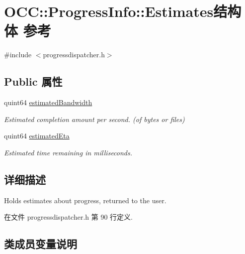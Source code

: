 \hypertarget{struct_o_c_c_1_1_progress_info_1_1_estimates}{}\section{O\+CC\+:\+:Progress\+Info\+:\+:Estimates结构体 参考}
\label{struct_o_c_c_1_1_progress_info_1_1_estimates}


{\ttfamily \#include $<$progressdispatcher.\+h$>$}

\subsection*{Public 属性}
\begin{DoxyCompactItemize}
\item 
quint64 \hyperlink{struct_o_c_c_1_1_progress_info_1_1_estimates_a2790557cd34d4a4725ed99bb0ed6b6bb}{estimated\+Bandwidth}
\begin{DoxyCompactList}\small\item\em Estimated completion amount per second. (of bytes or files) \end{DoxyCompactList}\item 
quint64 \hyperlink{struct_o_c_c_1_1_progress_info_1_1_estimates_a206645ff6cea68e6e6f24e9162059451}{estimated\+Eta}
\begin{DoxyCompactList}\small\item\em Estimated time remaining in milliseconds. \end{DoxyCompactList}\end{DoxyCompactItemize}


\subsection{详细描述}
Holds estimates about progress, returned to the user. 

在文件 progressdispatcher.\+h 第 90 行定义.



\subsection{类成员变量说明}
\mbox{\label{struct_o_c_c_1_1_progress_info_1_1_estimates_a2790557cd34d4a4725ed99bb0ed6b6bb}} 

